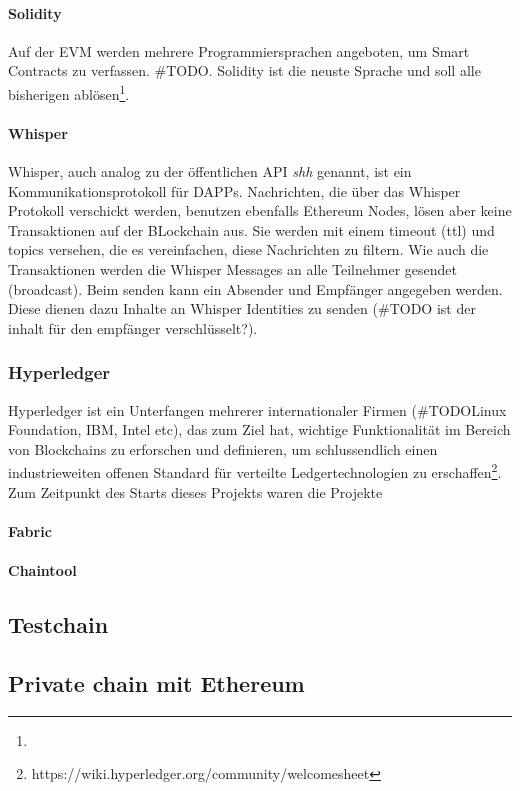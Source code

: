 \paragraph{Solidity}
Auf der \acrfull{EVM} werden mehrere Programmiersprachen angeboten, um Smart Contracts zu verfassen. \#TODO. Solidity ist die neuste Sprache und soll alle bisherigen ablösen\footnote{}.
\paragraph{Whisper}
Whisper, auch analog zu der öffentlichen API \emph{shh} genannt, ist ein Kommunikationsprotokoll für \acrfull{DAPPs}. Nachrichten, die über das Whisper Protokoll verschickt werden, benutzen ebenfalls Ethereum Nodes, lösen aber keine Transaktionen auf der BLockchain aus. Sie werden mit einem timeout (ttl) und topics versehen, die es vereinfachen, diese Nachrichten zu filtern. Wie auch die Transaktionen werden die Whisper Messages an alle Teilnehmer gesendet (broadcast). Beim senden kann ein Absender und Empfänger angegeben werden. Diese dienen dazu Inhalte an Whisper Identities zu senden (\#TODO ist der inhalt für den empfänger verschlüsselt?).

\subsubsection{Hyperledger}
Hyperledger ist ein Unterfangen mehrerer internationaler Firmen (\#TODOLinux Foundation, IBM, Intel etc), das zum Ziel hat, wichtige Funktionalität im Bereich von Blockchains zu erforschen und definieren, um schlussendlich einen industrieweiten offenen Standard für verteilte Ledgertechnologien zu erschaffen\footnote{https://wiki.hyperledger.org/community/welcomesheet}.
\\Zum Zeitpunkt des Starts dieses Projekts waren die Projekte 
\paragraph{Fabric}
\paragraph{Chaintool}

\subsection{Testchain}

\subsection{Private chain mit Ethereum}


